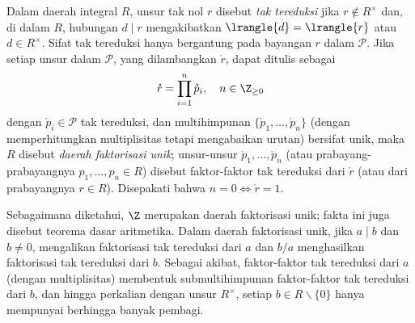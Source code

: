 \begin{definition}\label{def:UFD}
	Dalam daerah integral $R$, unsur tak nol $r$ disebut \emph{tak tereduksi} jika $r \notin R^\times$ dan, di dalam $R$, hubungan $d \mid r$ mengakibatkan $\lrangle{d} = \lrangle{r}$ atau $d \in R^\times$. Sifat tak tereduksi hanya bergantung pada bayangan $r$ dalam $\mathcal{P}$. Jika setiap unsur dalam $\mathcal{P}$, yang dilambangkan $\mathring{r}$, dapat ditulis sebagai
	\[ \mathring{r} = \prod_{i=1}^n \mathring{p}_i, \quad n \in \Z_{\geq 0} \]
	dengan $\mathring{p}_i \in \mathcal{P}$ tak tereduksi, dan multihimpunan $\{\mathring{p}_1, \ldots, \mathring{p}_n \}$ (dengan memperhitungkan multiplisitas tetapi mengabaikan urutan) bersifat unik, maka $R$ disebut \emph{daerah faktorisasi unik}; unsur-unsur $\mathring{p}_1, \ldots, \mathring{p}_n$ (atau prabayang-prabayangnya $p_1, \ldots, p_n \in R$) disebut faktor-faktor tak tereduksi dari $\mathring{r}$ (atau dari prabayangnya $r \in R$). Disepakati bahwa $n=0 \iff \mathring{r}=1$.
\end{definition}
Sebagaimana diketahui, $\Z$ merupakan daerah faktorisasi unik; fakta ini juga disebut teorema dasar aritmetika. Dalam daerah faktorisasi unik, jika $a \mid b$ dan $b \neq 0$, mengalikan faktorisasi tak tereduksi dari $a$ dan $b/a$ menghasilkan faktorisasi tak tereduksi dari $b$. Sebagai akibat, faktor-faktor tak tereduksi dari $a$ (dengan multiplisitas) membentuk submultihimpunan faktor-faktor tak tereduksi dari $b$, dan hingga perkalian dengan unsur $R^\times$, setiap $b \in R \smallsetminus \{0\}$ hanya mempunyai berhingga banyak pembagi.

